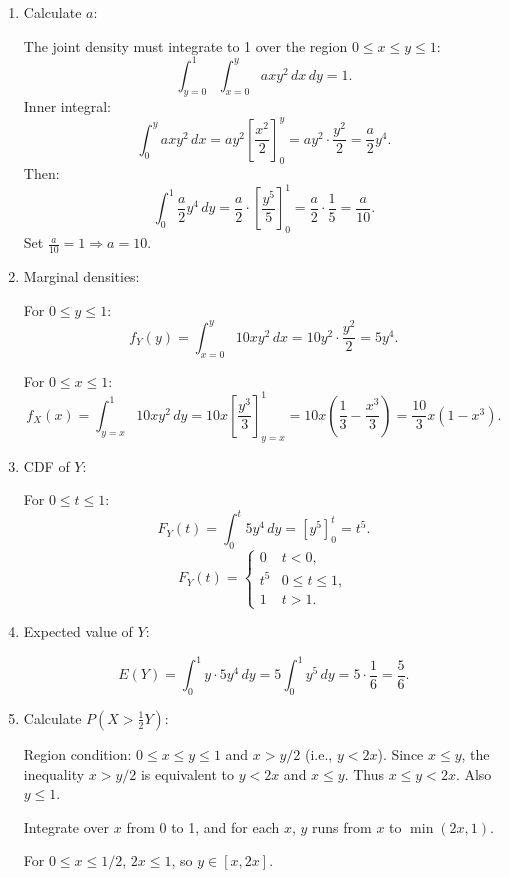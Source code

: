 \documentclass[12pt]{article}
\begin{document}
\begin{answerbox}
\begin{enumerate}
  \item Calculate \(a\):

  The joint density must integrate to 1 over the region \(0 \leq x \leq y \leq 1\):
\[
\int_{y=0}^{1} \int_{x=0}^{y} a x y^2 \, dx \, dy = 1.
\]
Inner integral: 
\[
\int_{0}^{y} a x y^2 \, dx = a y^2 \left[ \frac{x^2}{2} \right]_{0}^{y} = a y^2 \cdot \frac{y^2}{2} = \frac{a}{2} y^4.
\]
Then:
\[
\int_{0}^{1} \frac{a}{2} y^4 \, dy = \frac{a}{2} \cdot \left[ \frac{y^5}{5} \right]_{0}^{1} = \frac{a}{2} \cdot \frac{1}{5} = \frac{a}{10}.
\]
Set \(\frac{a}{10} = 1 \Rightarrow a = 10\).

\item Marginal densities:

For \(0 \leq y \leq 1\):
\[
f_Y(y) = \int_{x=0}^{y} 10 x y^2 \, dx = 10 y^2 \cdot \frac{y^2}{2} = 5 y^4.
\]

For \(0 \leq x \leq 1\):
\[
f_X(x) = \int_{y=x}^{1} 10 x y^2 \, dy = 10 x \left[ \frac{y^3}{3} \right]_{y=x}^{1} = 10 x \left( \frac{1}{3} - \frac{x^3}{3} \right) = \frac{10}{3} x (1 - x^3).
\]

  \item CDF of \(Y\):

  For \(0 \leq t \leq 1\):
\[
F_Y(t) = \int_{0}^{t} 5 y^4 \, dy = \left[ y^5 \right]_{0}^{t} = t^5.
\]
\[
F_Y(t) = 
\begin{cases}
0 & t < 0, \\
t^5 & 0 \leq t \leq 1, \\
1 & t > 1.
\end{cases}
\]

  \item Expected value of \(Y\):

  \[
E(Y) = \int_{0}^{1} y \cdot 5y^4 \, dy = 5 \int_{0}^{1} y^5 \, dy = 5 \cdot \frac{1}{6} = \frac{5}{6}.
\]

  \item Calculate \(P\left(X > \frac{1}{2} Y\right)\):

  Region condition: \(0 \leq x \leq y \leq 1\) and \(x > y/2\) (i.e., \(y < 2x\)).
Since \(x \leq y\), the inequality \(x > y/2\) is equivalent to \(y < 2x\) and \(x \leq y\).  
Thus \(x \leq y < 2x\). Also \(y \leq 1\).  

Integrate over \(x\) from 0 to 1, and for each \(x\), \(y\) runs from \(x\) to \(\min(2x, 1)\).

For \(0 \leq x \leq 1/2\), \(2x \leq 1\), so \(y \in [x, 2x]\).  


\end{enumerate}
\end{answerbox}
\end{document}
